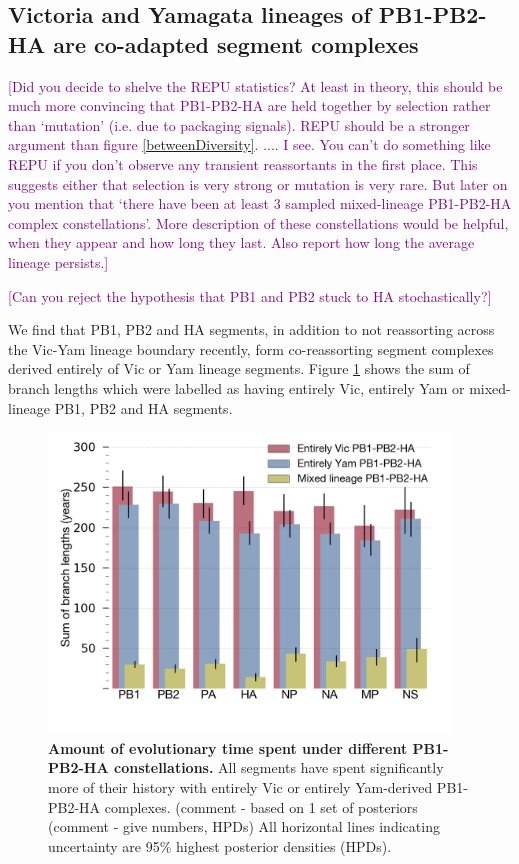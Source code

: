 \documentclass[11pt,oneside,letterpaper]{article}
\def\tbc#1{\textcolor{purple}{[#1]}}
\begin{document}
\subsection*{Victoria and Yamagata lineages of PB1-PB2-HA are co-adapted segment complexes}

\tbc{Did you decide to shelve the REPU statistics?  At least in theory, this should be much more convincing that PB1-PB2-HA are held together by selection rather than `mutation' (i.e. due to packaging signals).  REPU should be a stronger argument than figure \ref{betweenDiversity}. .... I see.  You can't do something like REPU if you don't observe any transient reassortants in the first place.  This suggests either that selection is very strong or mutation is very rare.  But later on you mention that `there have been at least 3 sampled mixed-lineage PB1-PB2-HA complex constellations'.  More description of these constellations would be helpful, when they appear and how long they last.  Also report how long the average lineage persists.}

\tbc{Can you reject the hypothesis that PB1 and PB2 stuck to HA stochastically?}

We find that PB1, PB2 and HA segments, in addition to not reassorting across the Vic-Yam lineage boundary recently, form co-reassorting segment complexes derived entirely of Vic or Yam lineage segments.
Figure \ref{stateTime} shows the sum of branch lengths which were labelled as having entirely Vic, entirely Yam or mixed-lineage PB1, PB2 and HA segments.

\begin{figure}[h]
	\centering		
	\includegraphics[width=0.95\textwidth]{figures/InfB_stateTime.png}
	\caption{\textbf{Amount of evolutionary time spent under different PB1-PB2-HA constellations.}
All segments have spent significantly more of their history with entirely Vic or entirely Yam-derived PB1-PB2-HA complexes.
(comment - based on 1 set of posteriors (comment - give numbers, HPDs)
All horizontal lines indicating uncertainty are 95\% highest posterior densities (HPDs).}
	\label{stateTime}
\end{figure}
\end{document}
